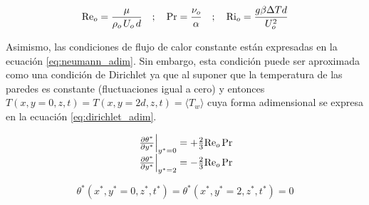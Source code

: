 $$\text{Re}_o = \frac{\mu}{\rho_o \hspace{0.5mm} U_o\hspace{0.5mm} d } \quad ; \quad \text{Pr}= \frac{\nu_o}{\alpha} \quad ; \quad \text{Ri}_o = \frac{g \beta \Delta T d}{U_o^2}$$

Asimismo, las condiciones de flujo de calor constante están expresadas en la ecuación \ref{eq:neumann_adim}. Sin embargo, esta condición puede ser aproximada como una condición de Dirichlet ya que al suponer que la temperatura de las paredes es constante (fluctuaciones igual a cero) y entonces $T(x,y=0,z,t) = T(x,y=2d,z,t) = \langle T_w \rangle$ cuya forma adimensional se expresa en la ecuación \ref{eq:dirichlet_adim}.

\begin{align}
\begin{array}{l}
    \left. \frac{\partial \theta^*}{\partial y^*} \right\vert_{y^*=0} = + \frac{2}{3} \text{Re}_o \hspace{0.5mm} \text{Pr} \\
    \left. \frac{\partial \theta^*}{\partial y^*} \right\vert_{y^*=2} = - \frac{2}{3} \text{Re}_o \hspace{0.5mm} \text{Pr} 
\end{array}
\label{eq:neumann_adim}
\end{align}

\begin{equation}
\theta^*(x^*,y^*=0,z^*,t^*) = \theta^*(x^*,y^*=2,z^*,t^*) = 0
\label{eq:dirichlet_adim}
\end{equation}



